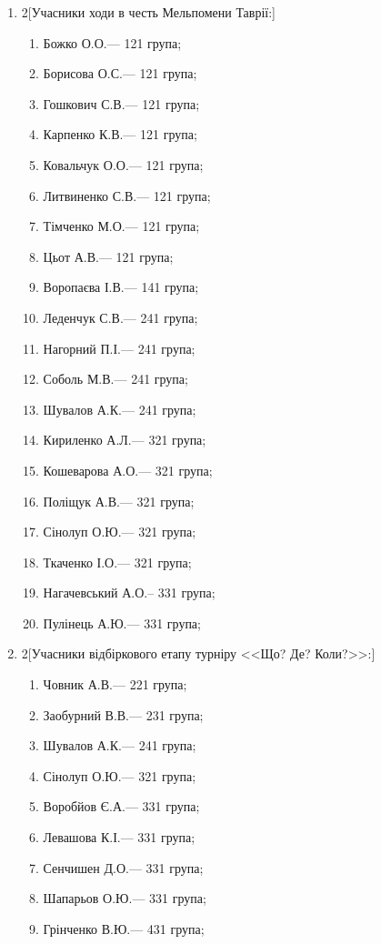 \documentclass[
	a4paper,
	12pt,
	oneside,
	draft
]{extreport}
\begin{document}
\begin{enumerate}[topsep=0pt,itemsep=-1ex,partopsep=1ex,parsep=1ex]


\item 
\begin{multicols}{2}[Учасники ходи в честь Мельпомени Таврії:] 
\begin{enumerate}[topsep=0pt,itemsep=-1ex,partopsep=1ex,parsep=1ex,label=\arabic*.]
\item Божко О.О.\hfill --- 121 група;
\item Борисова О.С.\hfill --- 121 група;
\item Гошкович С.В.\hfill --- 121 група;
\item Карпенко К.В.\hfill --- 121 група;
\item Ковальчук О.О.\hfill --- 121 група;
\item Литвиненко С.В.\hfill --- 121 група;
\item Тімченко М.О.\hfill --- 121 група;
\item Цьот А.В.\hfill --- 121 група;
\item Воропаєва І.В.\hfill --- 141 група;
\item Леденчук С.В.\hfill --- 241 група;
\item Нагорний П.І.\hfill --- 241 група;
\item Соболь М.В.\hfill --- 241 група;
\item Шувалов А.К.\hfill --- 241 група;
\item Кириленко А.Л.\hfill --- 321 група;
\item Кошеварова А.О.\hfill --- 321 група;
\item Поліщук А.В.\hfill --- 321 група;
\item Сінолуп О.Ю.\hfill --- 321 група;
\item Ткаченко І.О.\hfill --- 321 група;
\item Нагачевський А.О.\hfill -- 331 група;
\item Пулінець А.Ю.\hfill --- 331 група;
\end{enumerate}
\end{multicols}

\item 
\begin{multicols}{2}[Учасники відбіркового етапу турніру <<Що? Де? Коли?>>:] 
\begin{enumerate}[topsep=0pt,itemsep=-1ex,partopsep=1ex,parsep=1ex,label=\arabic*.]
\item Човник А.В.\hfill --- 221 група;
\item Заобурний В.В.\hfill --- 231 група;
\item Шувалов А.К.\hfill --- 241 група;
\item Сінолуп О.Ю.\hfill --- 321 група;
\item Воробйов Є.А.\hfill --- 331 група;
\item Левашова К.І.\hfill --- 331 група;
\item Сенчишен Д.О.\hfill --- 331 група;
\item Шапарьов О.Ю.\hfill --- 331 група;
\item Грінченко В.Ю.\hfill --- 431 група;
\end{enumerate}
\end{multicols}


\end{enumerate}
\end{document}
